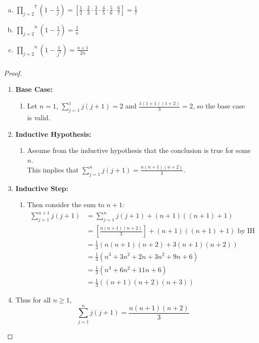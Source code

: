\documentclass[class=article, crop=false]{standalone}
\def\inlineprod#1#2{\overset{#2}{\underset{#1}{\prod}}}
\begin{document}
\subsubsection{}
\begin{enumerate}[(a)]

  \item
	$\inlineprod{j=2}{7}\left(1-\frac1j\right)
	= \left[\frac{1}{2}\cdot\frac{2}{3}\cdot\frac{3}{4}\cdot\frac{4}{5}\cdot\frac{5}{6}\cdot\frac{6}{7}\right]
	= \frac{1}{7}$
	
  \item
	$\inlineprod{j=2}{n}\left(1-\frac1j\right) = \frac{1}{n}$

  \item
	$\inlineprod{j=2}{n}\left(1-\frac1{j^2}\right) = \frac{n+1}{2n}$

  \end{enumerate}
\subsubsection{}
\begin{proof}
	$ $
	\begin{enumerate}
	  \item[] \textbf{Base Case:}
		\begin{enumerate}
		  \item[] Let $n=1$, $\sum_{j=1}^{1} j(j+1) = 2$ and $\frac{1(1+1)(1+2)}{3} = 2$, so the
		  base case is valid.
		\end{enumerate}
	  \item[] \textbf{Inductive Hypothesis:}
		\begin{enumerate}
		  \item[] Assume from the inductive hypothesis that the conclusion is true for some $n$.\\
		  This implies that $\sum_{j=1}^{n} j(j+1) = \frac{n(n+1)(n+2)}{3}$.
		\end{enumerate}
	  \item[] \textbf{Inductive Step:}
		\begin{enumerate}
		  \item[] Then consider the sum to $n+1$:
		  \begin{align*}
			\sum_{j=1}^{n+1}j(j+1) &= \sum_{j=1}^{n}j(j+1) + (n+1)((n+1)+1) \\
			&= \left[\frac{n(n+1)(n+2)}{3}\right] + (n+1)((n+1)+1) \text{ by IH} \\
			&= \frac{1}{3}\left(n(n+1)(n+2) + 3(n+1)(n+2)\right) \\
			&= \frac{1}{3}\left(n^3 + 3n^2 + 2n + 3n^2 + 9n + 6\right) \\
			&= \frac{1}{3}\left(n^3 + 6n^2 + 11n + 6\right) \\
			&= \frac{1}{3}\left((n+1)(n+2)(n+3)\right)
		  \end{align*}  
		\end{enumerate}
	  \item[] Thus for all $n\geq 1$, $$\sum_{j=1}^{n} j(j+1) = \frac{n(n+1)(n+2)}{3}$$     
	\end{enumerate}
  \end{proof}
\end{document}
